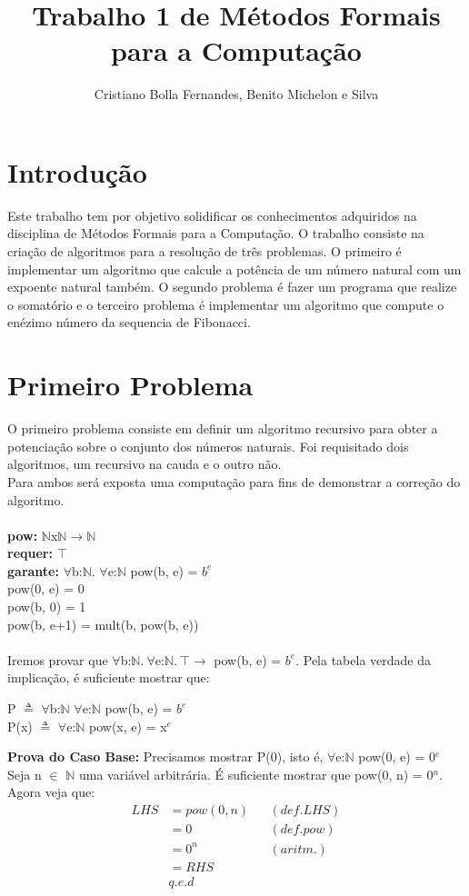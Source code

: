 \documentclass{article}
\title{Trabalho 1 de Métodos Formais para a Computação}
\author{Cristiano Bolla Fernandes, Benito Michelon e Silva}
\begin{document}
\maketitle

\section{Introdução}
Este trabalho tem por objetivo solidificar os conhecimentos adquiridos na disciplina de Métodos Formais para a Computação.
O trabalho consiste na criação de algoritmos para a resolução de três problemas. O primeiro é implementar um algoritmo que calcule a
potência de um número natural com um expoente natural também. O segundo problema é fazer um programa que realize o somatório e o
terceiro problema é implementar um algoritmo que compute o enézimo número da sequencia de Fibonacci.

\section{Primeiro Problema}
O primeiro problema consiste em definir um algoritmo recursivo para obter a potenciação sobre o conjunto dos números naturais.
Foi requisitado dois algoritmos, um recursivo na cauda e o outro não.\\
Para ambos será exposta uma computação para fins de demonstrar a correção do algoritmo.\\
\\
\textbf{pow:} $\mathbb{N}$x$\mathbb{N}$$ \rightarrow \mathbb{N}$\\
\textbf{requer:} $\top$\\
\textbf{garante:} $\forall$b:$\mathbb{N}$. $\forall$e:$\mathbb{N}$ pow(b, e) = $b^e$\\
pow(0, e) = 0\\
pow(b, 0) = 1\\
pow(b, e+1) = mult(b, pow(b, e))\\
\\
Iremos provar que $\forall$b:$\mathbb{N}.\:\forall$e:$\mathbb{N}.\:\top\rightarrow$ pow(b, e) = $b^e$. Pela tabela verdade da implicação, é suficiente mostrar que:\\
\begin{center}
P $\triangleq$ $\forall$b:$\mathbb{N}$ $\forall$e:$\mathbb{N}$ pow(b, e) = $b^e$\\
P(x) $\triangleq$ $\forall$e:$\mathbb{N}$ pow(x, e) = x$^e$\\
\end{center}
\textbf{Prova do Caso Base:} Precisamos mostrar P(0), isto é, $\forall$e:$\mathbb{N}$ pow(0, e) = 0$^e$\\
Seja n $\in$ $\mathbb{N}$ uma variável arbitrária. É suficiente mostrar que pow(0, n) = 0$^n$.\\
Agora veja que:
\begin{align*}
LHS &= pow(0, n) && (def. LHS)\\
&= 0 && (def. pow)\\
&= 0^n && (aritm.)\\
&= RHS\\
& q.e.d
\end{align*}
\end{document}
